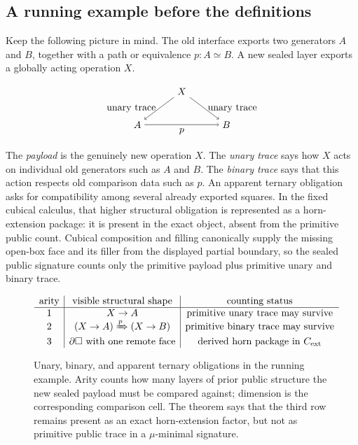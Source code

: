 \documentclass{lmcs}
\newcommand{\Cext}{C_{\mathrm{ext}}}
\begin{document}
\subsection{A running example before the definitions}
\label{subsec:running-example}

Keep the following picture in mind. The old interface exports two generators $A$ and $B$, together with a path or equivalence $p:A\simeq B$. A new sealed layer exports a globally acting operation $X$.

\[
\begin{tikzpicture}[baseline=(x.base)]
  \node (x) at (0,0) {$X$};
  \node (a) at (-1.6,-1.2) {$A$};
  \node (b) at (1.6,-1.2) {$B$};
  \draw[->] (x) -- node[left] {unary trace} (a);
  \draw[->] (x) -- node[right] {unary trace} (b);
  \draw[->] (a) -- node[below] {$p$} (b);
\end{tikzpicture}
\]

The \emph{payload} is the genuinely new operation $X$. The \emph{unary trace} says how $X$ acts on individual old generators such as $A$ and $B$. The \emph{binary trace} says that this action respects old comparison data such as $p$. An apparent ternary obligation asks for compatibility among several already exported squares. In the fixed cubical calculus, that higher structural obligation is represented as a horn-extension package: it is present in the exact object, absent from the primitive public count. Cubical composition and filling canonically supply the missing open-box face and its filler from the displayed partial boundary, so the sealed public signature counts only the primitive payload plus primitive unary and binary trace.

\begin{figure}[t]
\centering
\[
\begin{array}{c|c|c}
\text{arity} & \text{visible structural shape} & \text{counting status} \\
\hline
1 & X\to A & \text{primitive unary trace may survive} \\
2 & (X\to A)\xRightarrow{p}(X\to B) & \text{primitive binary trace may survive} \\
3 & \partial\Box\ \text{with one remote face} & \text{derived horn package in }\Cext
\end{array}
\]
\caption{Unary, binary, and apparent ternary obligations in the running example. Arity counts how many layers of prior public structure the new sealed payload must be compared against; dimension is the corresponding comparison cell. The theorem says that the third row remains present as an exact horn-extension factor, but not as primitive public trace in a $\mu$-minimal signature.}
\label{fig:arity-obligations}
\end{figure}
\end{document}
